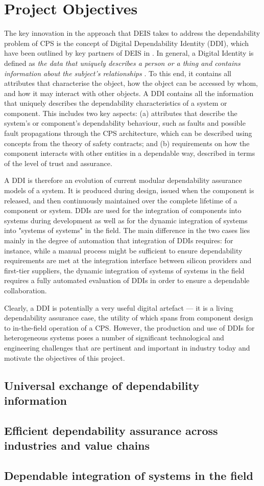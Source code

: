 \section{Project Objectives}
The key innovation in the approach that DEIS takes to address the dependability problem of CPS is the concept of Digital Dependability Identity (DDI), which have been outlined by key partners of DEIS in \cite{}. 
In general, a Digital Identity is defined as \emph{the data that uniquely describes a person or a thing and contains information about the subject's relationships} \cite{}. 
To this end, it contains all attributes that characterise the object, how the object can be accessed by whom, and how it may interact with other objects. A DDI contains all the information that uniquely describes the dependability characteristics of a system or component. This includes two key aspects: (a) attributes that describe the system’s or component’s dependability behaviour, such as faults and possible fault propagations through the CPS architecture, which can be described using concepts from the theory of safety contracts; and (b) requirements on how the component interacts with other entities in a dependable way, described in terms of the level of trust and assurance.

A DDI is therefore an evolution of current modular dependability assurance models of a system. It is produced during design, issued when the component is released, and then continuously maintained over the complete lifetime of a component or system. DDIs are used for the integration of components into systems during development as well as for the dynamic integration of systems into "systems of systems" in the field. The main difference in the two cases lies mainly in the degree of automation that integration of DDIs requires: for instance, while a manual process might be sufficient to ensure dependability requirements are met at the integration interface between silicon providers and first-tier suppliers, the dynamic integration of systems of systems in the field requires a fully automated evaluation of DDIs in order to ensure a dependable collaboration.

Clearly, a DDI is potentially a very useful digital artefact — it is a living dependability assurance case, the utility of which spans from component design to in-the-field operation of a CPS. However, the production and use of DDIs for heterogeneous systems poses a number of significant technological and engineering challenges that are pertinent and important in industry today and motivate the objectives of this project.

\subsection{Universal exchange of dependability 
information}


\subsection{Efficient dependability assurance across industries and value chains}


\subsection{Dependable integration of systems in the field}

